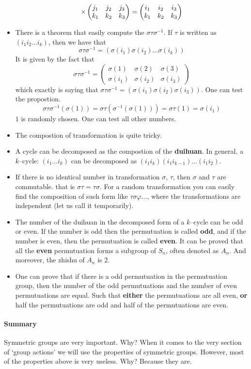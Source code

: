 \documentclass[../main.tex]{subfiles}
\begin{document}
\begin{itemize}
\[			{\large \times}
			\begin{pmatrix}
				j_1 & j_2 & j_3 \\
				k_1 & k_2 & k_3 
			\end{pmatrix} 
			= 
			\begin{pmatrix}
				i_{1} & i_{2} & i_{3} \\ 
				k_1 & k_2 & k_3 
			\end{pmatrix} 
		\]
	\item There is a theorem that easily compute the \(\sigma\tau\sigma ^{-1}\). 
		If \(\tau\) is written as \( (i_{1} i_2 \dots i_{k})\), then we have that
		\[
			\sigma\tau\sigma ^{-1} =  (\sigma (i_{1}) \sigma (i_{2})\dots\sigma (i_{k}))
			\]
			It is given by the fact that 
			\[
				\sigma\tau\sigma ^{-1} =  
				\begin{pmatrix}
					\sigma (1) &\sigma (2) &\sigma (3) \\
					\sigma (i_{1}) &\sigma (i_{2}) & \sigma (i_{3 }) %
				\end{pmatrix}
				\]
				which exactly is saying that \(\sigma\tau\sigma ^{-1} = (\sigma (i_{1})\sigma (i_{2})\sigma(i_{3}))\). One can test the propostion. \[\sigma\tau\sigma^{-1} (\sigma(1)) = \sigma\tau (\sigma^{-1}(\sigma (1))) = \sigma\tau (1) = \sigma (i_{1})\]
				\(1\) is randomly chosen. One can test all other numbers.
			\item The compostion of transformation is quite tricky. 
			\item A cycle can be decomposed as the compostion of the \textbf{duihuan}. In general, a \(k\)--cycle: \((i_1\dots i_{k})\) can be decomposed as \((i_{1}i_{k})(i_{1}i_{k-1})\dots (i_{1}i_{2})\).
			\item If there is no identical number in transformation \(\sigma\), \(\tau\), then \(\sigma\) and \(\tau\) are commutable. that is \(\sigma\tau =\tau\sigma\). For a random transformation you can easily find the composition of such form like \(\tau\sigma \varphi \dots \), where the transformations are independent (let us call it temporarily).
			\item The number of the duihuan in the decomposed form of a \(k\)--cycle can be odd or even. If the number is odd then the permutuation is called \textbf{odd}, and if the number is even, then the permutuation is called \textbf{even}. It can be proved that all the \textbf{even} permutuation forms a subgroup of \(S_{n}\), often denoted as \(A_{n}\). And moreover, the zhishu of \(A_{n}\) is \(2\).
			\item One can prove that if there is a odd permutuation in the permutuation group, then the number of the odd permutuations and the number of even permutuations are equal. Such that \textbf{either} the permutuations are all even, \textbf{or} half the permutuations are odd and half of the permutuations are even.
\end{itemize}

\paragraph{Summary} Symmetric groups are very important. Why? When it comes to the very section of `group actions' we will use the properties of symmetric groups. However, most of the properties above is very useless. Why? Because they are.
\end{document}
